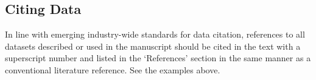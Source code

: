 \documentclass[english]{article}
\begin{document}
\subsection*{Citing Data}
In line with emerging industry-wide standards for data citation, references to all datasets described or used in the manuscript should be cited in the text with a superscript number and listed in the ‘References’ section in the same manner as a conventional literature reference. See the examples above.
\end{document}
